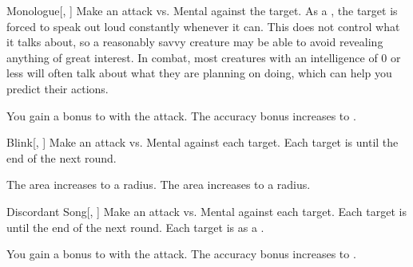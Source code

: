 \lowercase{\hypertarget{spell:Monologue}{}}\label{spell:Monologue}
\begin{freeability}[Rank 3]{\hypertarget{spell:Monologue}{Monologue}}[, ]
Make an attack vs. Mental against the target.
\hit As a , the target is forced to speak out loud constantly whenever it can.
This does not control what it talks about, so a reasonably savvy creature may be able to avoid revealing anything of great interest.
In combat, most creatures with an intelligence of 0 or less will often talk about what they are planning on doing, which can help you predict their actions.

\rankline
{} You gain a  bonus to  with the attack.
 The accuracy bonus increases to .
\end{freeability}
\vspace{0.25em}



\lowercase{\hypertarget{spell:Blink}{}}\label{spell:Blink}
\begin{freeability}[Rank 4]{\hypertarget{spell:Blink}{Blink}}[, ]
Make an attack vs. Mental against each target.
\hit Each target is  until the end of the next round.

\rankline
{} The area increases to a \areamed radius.
 The area increases to a \arealarge radius.
\end{freeability}
\vspace{0.25em}



\lowercase{\hypertarget{spell:Discordant Song}{}}\label{spell:Discordant Song}
\begin{freeability}[Rank 4]{\hypertarget{spell:Discordant Song}{Discordant Song}}[, ]
Make an attack vs. Mental against each target.
\hit Each target is \disoriented until the end of the next round.
\crit Each target is  as a .

\rankline
{} You gain a  bonus to  with the attack.
 The accuracy bonus increases to .
\end{freeability}
\vspace{0.25em}



